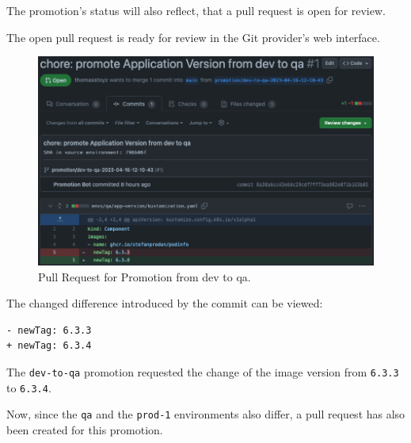 The promotion's status will also reflect, that
a pull request is open for review.



The open pull request is ready for review in the Git provider's web interface.
\begin{figure}[h]
	\centering
	\includegraphics[width=1.00\linewidth]{assets/prom-pr-dev-to-qa.png}
	\caption{Pull Request for Promotion from dev to qa.
	}
	\label{fig:prom-pr-dev-to-qa}	
\end{figure}

The changed difference introduced by the commit can be viewed:

\begin{lstlisting}
- newTag: 6.3.3
+ newTag: 6.3.4
\end{lstlisting}

The \lstinline|dev-to-qa| promotion requested the change of the image version from
\lstinline|6.3.3| to \lstinline|6.3.4|.

Now, since the \lstinline|qa| and the \lstinline|prod-1| environments
also differ,
a pull request has also been created for this promotion.


